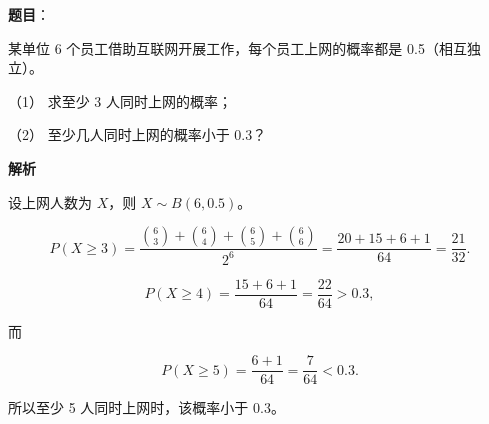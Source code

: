 \begin{answer}

\textbf{题目}：

某单位 6 个员工借助互联网开展工作，每个员工上网的概率都是 0.5（相互独立）。

（1） 求至少 3 人同时上网的概率；

（2） 至少几人同时上网的概率小于 0.3？

\textbf{解析}

设上网人数为 $X$，则 $X\sim B(6,0.5)$。


\nopagebreak[4]
\[
P(X\geqslant3)
=\frac{\binom63+\binom64+\binom65+\binom66}{2^6}
=\frac{20+15+6+1}{64}
=\frac{21}{32}.
\]


\nopagebreak[4]
\[
P(X\geqslant4)=\frac{15+6+1}{64}=\frac{22}{64}>0.3,
\]

而

\nopagebreak[4]
\[
P(X\geqslant5)=\frac{6+1}{64}=\frac7{64}<0.3.
\]

所以至少 5 人同时上网时，该概率小于 $0.3$。



\end{answer}
